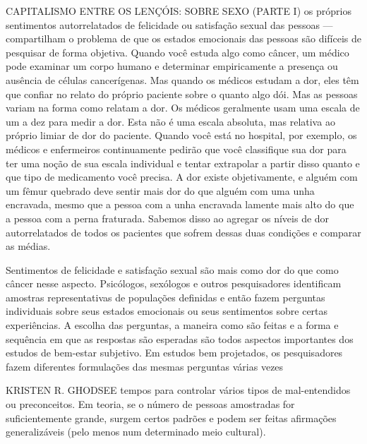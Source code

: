 CAPITALISMO ENTRE OS LENÇÓIS: SOBRE SEXO (PARTE I) os próprios sentimentos autorrelatados de felicidade ou satisfação sexual das pessoas — compartilham o problema de que os estados emocionais das pessoas são difíceis de pesquisar de forma objetiva. Quando você estuda algo como câncer, um médico pode examinar um corpo humano e determinar empiricamente a presença ou ausência de células cancerígenas. Mas quando os médicos estudam a dor, eles têm que confiar no relato do próprio paciente sobre o quanto algo dói. Mas as pessoas variam na forma como relatam a dor. Os médicos geralmente usam uma escala de um a dez para medir a dor. Esta não é uma escala absoluta, mas relativa ao próprio limiar de dor do paciente. Quando você está no hospital, por exemplo, os médicos e enfermeiros continuamente pedirão que você classifique sua dor para ter uma noção de sua escala individual e tentar extrapolar a partir disso quanto e que tipo de medicamento você precisa. A dor existe objetivamente, e alguém com um fêmur quebrado deve sentir mais dor do que alguém com uma unha encravada, mesmo que a pessoa com a unha encravada lamente mais alto do que a pessoa com a perna fraturada. Sabemos disso ao agregar os níveis de dor autorrelatados de todos os pacientes que sofrem dessas duas condições e comparar as médias.
 \par 
Sentimentos de felicidade e satisfação sexual são mais como dor do que como câncer nesse aspecto. Psicólogos, sexólogos e outros pesquisadores identificam amostras representativas de populações definidas e então fazem perguntas individuais sobre seus estados emocionais ou seus sentimentos sobre certas experiências. A escolha das perguntas, a maneira como são feitas e a forma e sequência em que as respostas são esperadas são todos aspectos importantes dos estudos de bem-estar subjetivo. Em estudos bem projetados, os pesquisadores fazem diferentes formulações das mesmas perguntas várias vezes
 \par 
KRISTEN R. GHODSEE tempos para controlar vários tipos de mal-entendidos ou preconceitos. Em teoria, se o número de pessoas amostradas for suficientemente grande, surgem certos padrões e podem ser feitas afirmações generalizáveis ​​(pelo menos num determinado meio cultural).
 \par 
